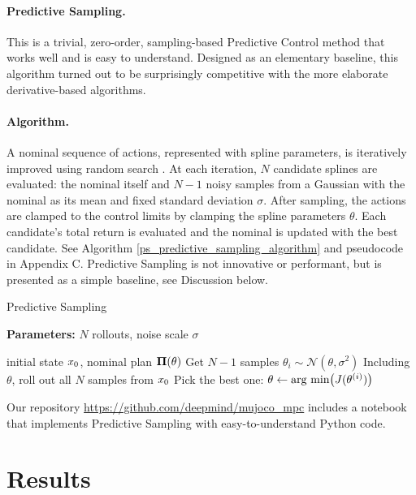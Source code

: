 \paragraph{Predictive Sampling.}

This is a trivial, zero-order, sampling-based Predictive Control method that works well and is easy to understand. Designed as an elementary baseline, this algorithm turned out to be surprisingly competitive with the more elaborate derivative-based algorithms.

\paragraph{Algorithm.} A nominal sequence of actions, represented with spline parameters, is iteratively improved using random search \cite{matyas1965random}. At each iteration, $N$ candidate splines are evaluated: the nominal itself and $N-1$ noisy samples from a Gaussian with the nominal as its mean and fixed standard deviation $\sigma$. After sampling, the actions are clamped to the control limits by clamping the spline parameters $\theta$. Each candidate's total return is evaluated and the nominal is updated with the best candidate. See Algorithm \ref{ps_predictive_sampling_algorithm} and pseudocode in Appendix C. Predictive Sampling is not innovative or performant, but is presented as a simple baseline, see Discussion below.

\begin{algorithm}[H]
	\caption{Predictive Sampling}\label{ps_predictive_sampling_algorithm}
	\textbf{Parameters:} $N$ rollouts, noise scale $\sigma$
	\begin{algorithmic}[1]
		\Require initial state ${x}_0$, nominal plan ${\mathbf{\Pi}}(\theta)$
		\State Get $N\!-\!1$ samples $\theta_i \sim \mathcal{N}(\theta, \sigma^2)$
		\State Including $\theta$, roll out all $N$ samples from ${x}_0$
		\State Pick the best one: $\theta \leftarrow \mbox{arg min} \bigl({J}(\theta^{(i)})\bigr)$
	\end{algorithmic}
\end{algorithm}

Our repository \url{https://github.com/deepmind/mujoco_mpc} includes a notebook that implements Predictive Sampling with easy-to-understand Python code.

\section{Results} \label{ps_results}

